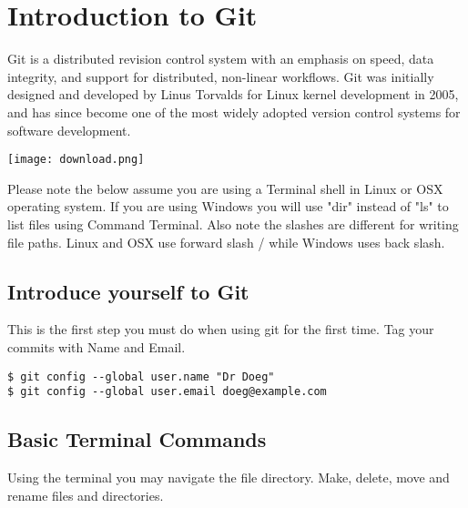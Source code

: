 \chapter{Introduction to Git}
Git is a distributed revision control system with an emphasis on speed, data integrity, and support for distributed, non-linear workflows.  Git was initially designed and developed by Linus Torvalds for Linux kernel development in 2005, and has since become one of the most widely adopted version control systems for software development.
\begin{marginfigure}%
  \texttt{[image: download.png]}
  \label{fig:marginfig}
\end{marginfigure}
Please note the below assume you are using a Terminal shell in Linux or OSX operating system. If you are using Windows you will use "dir" instead of "ls" to list files using Command Terminal. Also note the slashes are different for writing file paths. Linux and OSX use forward slash / while Windows uses back slash.

\vspace{1cm}

\section{Introduce yourself to Git}

\begin{marginfigure}[60pt]

This is the first step you must do when using git for the first time. Tag your commits with Name and Email.
\end{marginfigure}
\begin{shaded}
\begin{verbatim}
$ git config --global user.name "Dr Doeg"
$ git config --global user.email doeg@example.com
\end{verbatim}
\end{shaded}


\newpage

\section{Basic Terminal Commands }

Using the terminal you may navigate the file directory.  Make, delete, move and rename files and directories.

